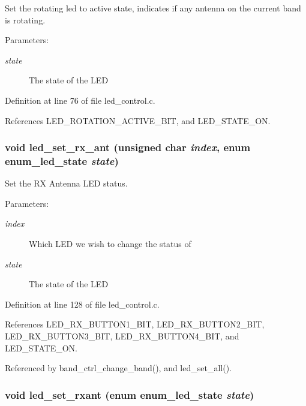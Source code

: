 Set the rotating led to active state, indicates if any antenna on the current band is rotating. 

\begin{Desc}
\item[Parameters:]
\begin{description}
\item[{\em state}]The state of the LED \end{description}
\end{Desc}


Definition at line 76 of file led\_\-control.c.

References LED\_\-ROTATION\_\-ACTIVE\_\-BIT, and LED\_\-STATE\_\-ON.
\subsubsection[{led\_\-set\_\-rx\_\-ant}]{\setlength{\rightskip}{0pt plus 5cm}void led\_\-set\_\-rx\_\-ant (unsigned char {\em index}, \/  enum {\bf enum\_\-led\_\-state} {\em state})}\label{led__control_8h_5a7a9162c3fb5416a9c2f9608c88021b}


Set the RX Antenna LED status. 

\begin{Desc}
\item[Parameters:]
\begin{description}
\item[{\em index}]Which LED we wish to change the status of \item[{\em state}]The state of the LED \end{description}
\end{Desc}


Definition at line 128 of file led\_\-control.c.

References LED\_\-RX\_\-BUTTON1\_\-BIT, LED\_\-RX\_\-BUTTON2\_\-BIT, LED\_\-RX\_\-BUTTON3\_\-BIT, LED\_\-RX\_\-BUTTON4\_\-BIT, and LED\_\-STATE\_\-ON.

Referenced by band\_\-ctrl\_\-change\_\-band(), and led\_\-set\_\-all().
\subsubsection[{led\_\-set\_\-rxant}]{\setlength{\rightskip}{0pt plus 5cm}void led\_\-set\_\-rxant (enum {\bf enum\_\-led\_\-state} {\em state})}\label{led__control_8h_1842fb4da0f83f83c77493a3dd2ddfb8}


